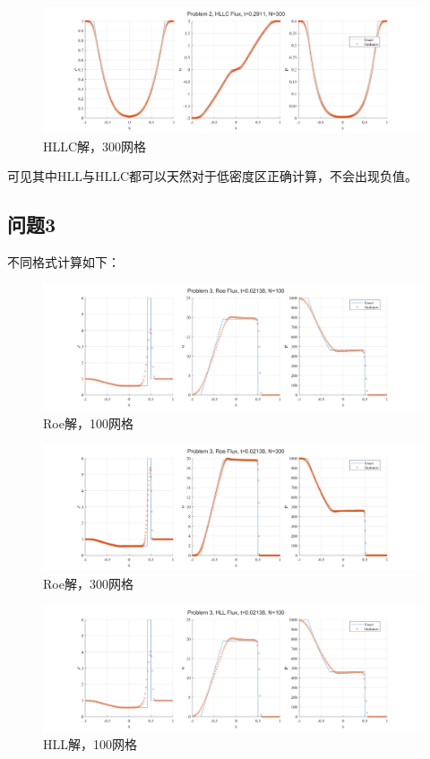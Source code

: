 \documentclass[UTF8,zihao=5]{ctexart} %
\begin{document}
\begin{figure}[H]
    \centering
    \includegraphics[width=18cm]{p2_HLLC_N300.png}  %
    \caption{HLLC解，300网格}
\end{figure}

可见其中HLL与HLLC都可以天然对于低密度区正确计算，不会出现负值。

\subsection{问题3}

不同格式计算如下：

\begin{figure}[H]
    \centering
    \includegraphics[width=18cm]{p3_Roe_N100.png}  %
    \caption{Roe解，100网格}
\end{figure}

\begin{figure}[H]
    \centering
    \includegraphics[width=18cm]{p3_Roe_N300.png}  %
    \caption{Roe解，300网格}
\end{figure}

\begin{figure}[H]
    \centering
    \includegraphics[width=18cm]{p3_HLL_N100.png}  %
    \caption{HLL解，100网格}
\end{figure}
\end{document}
